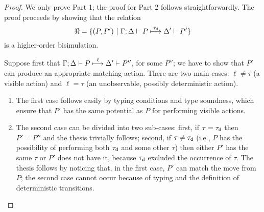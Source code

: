 \begin{proof}
We only prove Part 1; the proof for Part 2 follows straightforwardly.
The proof proceeds by showing that the relation 
$$
\Re = \{ (P,P') ~|~ \Gamma; \Delta \vdash P \stackrel{\tau_{\mathsf{d}}}{\longmapsto} \Delta' \vdash P'\}
$$
is a higher-order bisimulation. 

Suppose first that 
$\Gamma; \Delta \vdash P \stackrel{\ell}{\longmapsto} \Delta' \vdash P''$, for some $P''$; we have to show that $P'$ can produce an appropriate matching action.
There are two main cases: $\ell \neq \tau$ (a visible action) and  $\ell = \tau$ (an unobservable, possibly deterministic action). 
\begin{enumerate}[1.]
\item The first case follows easily by typing conditions and type soundness, which ensure that $P'$ has the same potential as $P$ for performing visible actions. 
\item The second case can be divided into two sub-cases: first, if $\tau = \tau_{\mathsf{d}}$ then $P' = P''$ and the thesis trivially follows; second, if $\tau \neq \tau_{\mathsf{d}}$ (i.e., $P$ has the possibility of performing both $\tau_{\mathsf{d}}$ and some other $\tau$) 
then either $P'$ has the same $\tau$ or $P'$ does not have it, because $\tau_{\mathsf{d}}$ excluded the occurrence of $\tau$. 
The thesis follows by noticing that, in the first case, $P'$ can match the move from $P$; the second case cannot occur because of typing and the definition of deterministic transitions. 
\end{enumerate}


\end{proof}
